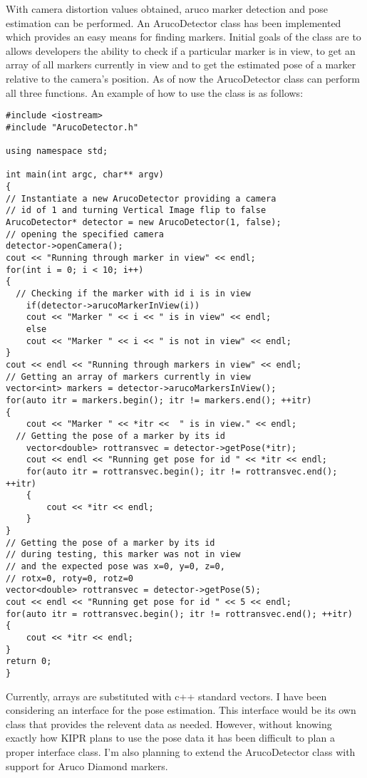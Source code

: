 \documentclass[twoside]{report}
\begin{document}
      With camera distortion values obtained, aruco marker detection and pose
    estimation can be performed. An ArucoDetector class has been implemented which
    provides an easy means for finding markers.  Initial goals of the class are
    to allows developers the ability to check if a particular marker is in view,
    to get an array of all markers currently in view and to get the estimated
    pose of a marker relative to the camera's position. As of now the ArucoDetector
    class can perform all three functions.  An example of how to use the class is
    as follows:
    \begin{lstlisting}
#include <iostream>
#include "ArucoDetector.h"

using namespace std;

int main(int argc, char** argv)
{
// Instantiate a new ArucoDetector providing a camera
// id of 1 and turning Vertical Image flip to false
ArucoDetector* detector = new ArucoDetector(1, false);
// opening the specified camera
detector->openCamera();
cout << "Running through marker in view" << endl;
for(int i = 0; i < 10; i++)
{
  // Checking if the marker with id i is in view
	if(detector->arucoMarkerInView(i))
	cout << "Marker " << i << " is in view" << endl;
	else
	cout << "Marker " << i << " is not in view" << endl;
}
cout << endl << "Running through markers in view" << endl;
// Getting an array of markers currently in view
vector<int> markers = detector->arucoMarkersInView();
for(auto itr = markers.begin(); itr != markers.end(); ++itr)
{
	cout << "Marker " << *itr <<  " is in view." << endl;
  // Getting the pose of a marker by its id
	vector<double> rottransvec = detector->getPose(*itr);
	cout << endl << "Running get pose for id " << *itr << endl;
	for(auto itr = rottransvec.begin(); itr != rottransvec.end(); ++itr)
	{
		cout << *itr << endl;
	}
}
// Getting the pose of a marker by its id
// during testing, this marker was not in view
// and the expected pose was x=0, y=0, z=0,
// rotx=0, roty=0, rotz=0
vector<double> rottransvec = detector->getPose(5);
cout << endl << "Running get pose for id " << 5 << endl;
for(auto itr = rottransvec.begin(); itr != rottransvec.end(); ++itr)
{
	cout << *itr << endl;
}
return 0;
}
  \end{lstlisting}
  Currently, arrays are substituted with c++ standard vectors. I have been
  considering an interface for the pose estimation. This interface would be
  its own class that provides the relevent data as needed. However, without
  knowing exactly how KIPR plans to use the pose data it has been difficult
  to plan a proper interface class. I'm also planning to extend the ArucoDetector
  class with support for Aruco Diamond markers.
\end{document}
